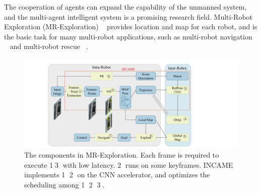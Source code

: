 \label{sec:intro}

The cooperation of agents can expand the capability of the unmanned system, and the multi-agent intelligent system is a promising research field.
Multi-Robot Exploration (MR-Exploration)  ~\cite{corah2019communication} provides location and map for each robot, and is the basic task for many multi-robot applications, such as multi-robot navigation  ~\cite{tanner2005towards} and multi-robot rescue  ~\cite{baxter2007multi}.


\begin{figure}[t]
    \centering
	\includegraphics[width=0.99\linewidth]{fig/maexp.pdf}
     \caption{
        The components in MR-Exploration.  Each frame is required to execute \textcircled{1}\textcircled{3} with low latency. \textcircled{2} runs on some keyframes. INCAME implements \textcircled{1} \textcircled{2} on the CNN accelerator, and optimizes the scheduling among \textcircled{1} \textcircled{2} \textcircled{3}.
    }
	\label{fig:maexp}
\end{figure}

